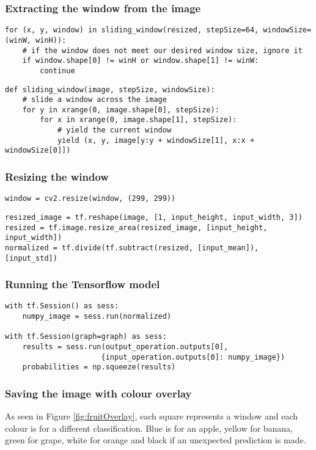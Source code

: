 \tocless\subsubsection{Extracting the window from the image}
\begin{lstlisting}[style=Python]
for (x, y, window) in sliding_window(resized, stepSize=64, windowSize=(winW, winH)):
	# if the window does not meet our desired window size, ignore it
	if window.shape[0] != winH or window.shape[1] != winW:
		continue
\end{lstlisting}


\begin{lstlisting}[style=Python]
def sliding_window(image, stepSize, windowSize):
	# slide a window across the image
	for y in xrange(0, image.shape[0], stepSize):
		for x in xrange(0, image.shape[1], stepSize):
			# yield the current window
			yield (x, y, image[y:y + windowSize[1], x:x + windowSize[0]])
\end{lstlisting}

\tocless\subsubsection{Resizing the window}
\begin{lstlisting}[style=Python]
window = cv2.resize(window, (299, 299))
\end{lstlisting}

\begin{lstlisting}[style=Python]
resized_image = tf.reshape(image, [1, input_height, input_width, 3])
resized = tf.image.resize_area(resized_image, [input_height, input_width])
normalized = tf.divide(tf.subtract(resized, [input_mean]), [input_std])
\end{lstlisting}

\tocless\subsubsection{Running the Tensorflow model}
\begin{lstlisting}[style=Python]
with tf.Session() as sess:
	numpy_image = sess.run(normalized)

with tf.Session(graph=graph) as sess:
    results = sess.run(output_operation.outputs[0],
                      {input_operation.outputs[0]: numpy_image})
	probabilities = np.squeeze(results)
\end{lstlisting}

\tocless\subsubsection{Saving the image with colour overlay}
As seen in Figure \ref{fig:fruitOverlay}, each square represents a window and
each colour is for a different classification. Blue is for an apple, yellow for
banana, green for grape, white for orange and black if an unexpected prediction
is made.

